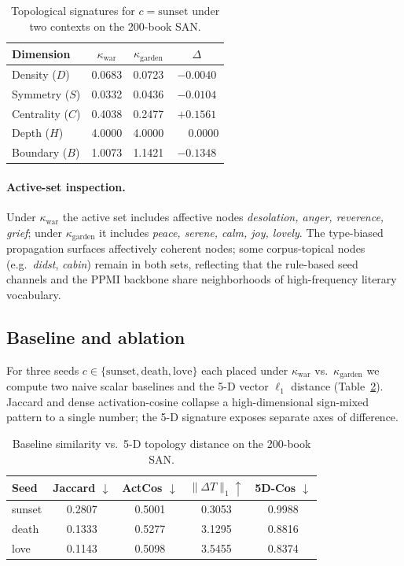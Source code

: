 \documentclass{article}
\begin{document}
\begin{table}[h]
\centering
\caption{Topological signatures for $c = \text{sunset}$ under two contexts
on the 200-book SAN.}
\label{tab:sunset}
\begin{tabular}{lccc}
\toprule
\textbf{Dimension} & $\kappa_{\text{war}}$ & $\kappa_{\text{garden}}$ & $\Delta$ \\
\midrule
Density ($D$)    & 0.0683 & 0.0723 & $-0.0040$ \\
Symmetry ($S$)   & 0.0332 & 0.0436 & $-0.0104$ \\
Centrality ($C$) & 0.4038 & 0.2477 & $+0.1561$ \\
Depth ($H$)      & 4.0000 & 4.0000 & $\phantom{+}0.0000$ \\
Boundary ($B$)   & 1.0073 & 1.1421 & $-0.1348$ \\
\bottomrule
\end{tabular}
\end{table}

\paragraph{Active-set inspection.} Under
$\kappa_{\text{war}}$ the active set includes affective nodes
\textit{desolation, anger, reverence, grief}; under $\kappa_{\text{garden}}$
it includes \textit{peace, serene, calm, joy, lovely}. The type-biased
propagation surfaces affectively coherent nodes; some corpus-topical nodes
(e.g.\ \textit{didst}, \textit{cabin}) remain in both sets, reflecting that
the rule-based seed channels and the PPMI backbone share neighborhoods of
high-frequency literary vocabulary.

\subsection{Baseline and ablation}
\label{subsec:baseline}
For three seeds $c \in \{\text{sunset}, \text{death}, \text{love}\}$ each
placed under $\kappa_{\text{war}}$ vs.\ $\kappa_{\text{garden}}$ we compute
two naive scalar baselines and the 5-D vector $\ell_1$ distance
(Table~\ref{tab:baseline}). Jaccard and dense activation-cosine collapse a
high-dimensional sign-mixed pattern to a single number; the 5-D signature
exposes separate axes of difference.

\begin{table}[h]
\centering
\caption{Baseline similarity vs.\ 5-D topology distance on the 200-book SAN.}
\label{tab:baseline}
\begin{tabular}{lcccc}
\toprule
Seed & Jaccard $\downarrow$ & ActCos $\downarrow$ & $\|\Delta T\|_1
\uparrow$ & 5D-Cos $\downarrow$ \\
\midrule
sunset & 0.2807 & 0.5001 & 0.3053 & 0.9988 \\
death  & 0.1333 & 0.5277 & 3.1295 & 0.8816 \\
love   & 0.1143 & 0.5098 & 3.5455 & 0.8374 \\
\bottomrule
\end{tabular}
\end{table}
\end{document}
